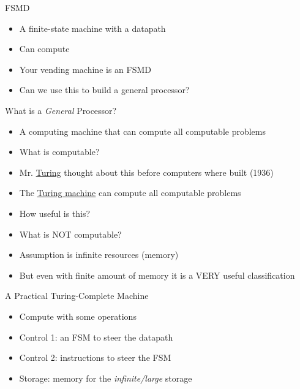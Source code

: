 
\begin{frame}[fragile]{FSMD}
\begin{itemize}
\item A finite-state machine with a datapath
\item Can compute
\item Your vending machine is an FSMD
\item Can we use this to build a general processor?
\end{itemize}
\end{frame}

\begin{frame}[fragile]{What is a \emph{General} Processor?}
\begin{itemize}
\item A computing machine that can compute all computable problems
\item What is computable?
\item Mr. \href{https://en.wikipedia.org/wiki/Alan_Turing}{Turing} thought about this before computers where built (1936)
\item The \href{https://en.wikipedia.org/wiki/Turing_machine}{Turing machine} can compute all computable problems
\item How useful is this?
\item What is NOT computable?
\item Assumption is infinite resources (memory)
\item But even with finite amount of memory it is a VERY useful classification
\end{itemize}
\end{frame}

\begin{frame}[fragile]{A Practical Turing-Complete Machine}
\begin{itemize}
\item Compute with some operations
\item Control 1: an FSM to steer the datapath
\item Control 2: instructions to steer the FSM
\item Storage: memory for the \emph{infinite/large} storage
\end{itemize}
\end{frame}

